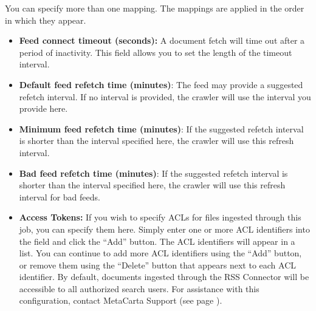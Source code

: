 You can specify more than one mapping. The mappings are applied in the
order in which they appear.




\begin{itemize}

\item \textbf{Feed connect timeout (seconds):} A document fetch will time out after a period of inactivity. This field allows you to set the length of the timeout interval.

\item \textbf{Default feed refetch time (minutes)}: The feed may provide a suggested refetch interval. If no interval is provided, the crawler will use the interval you provide here.

\item \textbf{Minimum feed refetch time (minutes)}: If the suggested refetch interval is shorter than the interval specified here, the crawler will use this refresh interval.

\item \textbf{Bad feed refetch time (minutes)}: If the suggested refetch interval is shorter than the interval specified here, the crawler will use this refresh interval for bad feeds. 

\end{itemize}


\begin{itemize}

\item \textbf{Access Tokens:} If you wish to specify ACLs for files ingested through this job, you can specify them here. Simply enter one or more ACL identifiers into the field and click the ``Add'' button. The ACL identifiers will appear in a list. You can continue to add more ACL identifiers using the ``Add'' button, or remove them using the ``Delete'' button that appears next to each ACL identifier. By default, documents ingested through the RSS Connector will be accessible to all authorized search users. For assistance with this configuration, contact MetaCarta Support (see page \pageref{SupportContact}).

\end{itemize}

